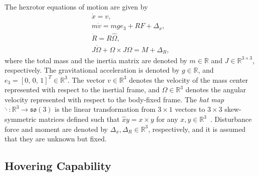 \documentclass[twocolumn,letterpaper]{IEEEAerospaceCLS}  %
\newcommand{\so}{\ensuremath{\mathfrak{so}(3)}}
\renewcommand{\Re}{\mathbb{R}}
\begin{document}
%

The hexrotor equations of motion are given by
\begin{gather}
\dot x=v,\label{eqn:xdot} \\
m\dot v=mge_3+RF+\Delta_x, \label{eqn:vdot}\\
\dot R=R\hat \Omega,\\
J\dot\Omega + \Omega\times J\Omega =M+\Delta_R,\label{eqn:Wdot}
\end{gather}
where the total mass and the inertia matrix are denoted by $m\in\Re$ and $J\in{\Re}^{3\times 3}$, respectively. The gravitational acceleration is denoted by $g\in\Re$, and $e_3=[0,\,0,\,1]^T\in{\Re}^3$. The vector $v\in{\Re}^3$ denotes the velocity of the mass center represented with respect to the inertial frame, and $\Omega\in{\Re}^3$ denotes the angular velocity represented with respect to the body-fixed frame. The \textit{hat map} $\hat\cdot:{\Re}^3\rightarrow\so$ is the linear transformation from $3\times 1$ vectors to $3\times 3$ skew-symmetric matrices defined such that $\hat xy=x\times y$ for any $x,y\in{\Re}^3$~\cite{MarRat99}. Disturbance force and moment are denoted by $\Delta_x,\Delta_R\in{\Re}^3$, respectively, and it is assumed that they are unknown but fixed.


\subsection{Hovering Capability}
\end{document}
